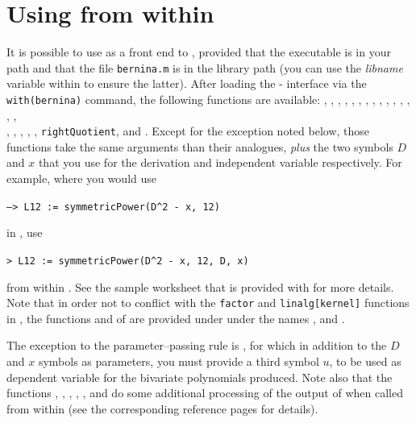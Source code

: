 \section{Using \bernina{} from within \maple}
It is possible to use \maple{} as a front end
to \bernina, provided that
the \bernina{} executable is in your path and that the file {\tt bernina.m}
is in the \maple{} library path (you can use the {\em libname} variable within
\maple{} to ensure the latter). After loading the \maple-\bernina{} interface
via the {\tt with(bernina)} command, the following functions are available:
, ,
, ,
,
, , %
,
, , ,
, ,
,
,\\ %
,
, ,
, , {\tt rightQuotient},
and . %
Except for the exception noted below, those functions take the
same arguments than their \bernina{} analogues, {\em plus} the two symbols
$D$ and $x$ that you use for the derivation and independent variable
respectively. For example, where you would use
\begin{center}
{\tt --> L12 := symmetricPower(D\^{}2 - x, 12)} 
\end{center}
in \bernina, use
\begin{center}
{\tt > L12 := symmetricPower(D\^{}2 - x, 12, D, x)}
\end{center}
from within \maple.
See the sample \maple{} worksheet that is provided with \bernina{} for
more details. Note that in order not to conflict with the
{\tt factor} and {\tt linalg[kernel]} functions in \maple,
the functions  and 
of \bernina{} are provided under \maple{} under the names
,
 and .

The
exception
to the parameter--passing rule
is
,
for which in addition to the $D$ and $x$ symbols as parameters,
you must provide a third symbol $u$, to be used as dependent variable
for the bivariate polynomials produced.
Note also that the functions
, ,
, ,
,
 and 
do some additional processing of the output of \bernina{}
when called from within \maple{} (see the corresponding reference
pages for details).

